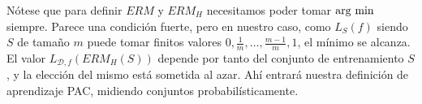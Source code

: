 Nótese que para definir $ERM$ y $ERM_H$ necesitamos poder tomar $\operatorname*{arg\,\min}$ siempre. Parece una condición fuerte,
pero en nuestro caso, como $L_{S}(f)$ siendo $S$ de tamaño $m$ puede tomar finitos valores $0, \frac{1}{m}, \ldots, \frac{m-1}{m},1$,
el mínimo se alcanza. El valor $L_{\mathcal{D},f}(ERM_H(S))$ depende por tanto del conjunto de entrenamiento $S$, y la elección del
mismo está sometida al azar. Ahí entrará nuestra definición de aprendizaje PAC, midiendo conjuntos probabilísticamente.
